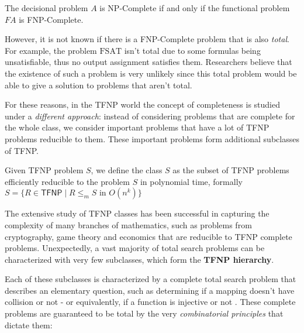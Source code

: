 \begin{proposition}
 The decisional problem $A$ is \textsf{NP}-Complete if and only if the functional problem $FA$ is \textsf{FNP}-Complete.
\end{proposition}
    
However, it is not known if there is a \textsf{FNP}-Complete problem that is also \textit{total}. For example, the problem $\mathrm{FSAT}$ isn't total due to some formulas being unsatisfiable, thus no output assignment satisfies them. Researchers believe that the existence of such a problem is very unlikely since this total problem would be able to give a solution to problems that aren't total. 

For these reasons, in the \textsf{TFNP} world the concept of completeness is studied under a \textit{different approach}: instead of considering problems that are complete for the whole class, we consider important problems that have a lot of \textsf{TFNP} problems reducible to them. These important problems form additional subclasses of \textsf{TFNP}.  

\begin{definition}
 Given \textsf{TFNP} problem $S$, we define the class $S$ as the subset of \textsf{TFNP} problems efficiently reducible to the problem $S$ in polynomial time, formally $S = \{R \in \mathsf{TFNP} \mid R \leq_m S \text{ in } O(n^k)\}$
\end{definition}

The extensive study of \textsf{TFNP} classes has been successful in capturing the complexity of many branches of mathematics, such as problems from cryptography, game theory and economics that are reducible to TFNP complete problems. Unexpectedly, a vast majority of total search problems can be characterized with very few subclasses, which form the \textbf{\textsf{TFNP} hierarchy}. 

\newpage

Each of these subclasses is characterized by a complete total search problem that describes an elementary question, such as determining if a mapping doesn't have collision or not - or equivalently, if a function is injective or not \cite{proofs_circuits_communication,tfnp_characterization}. These complete problems are guaranteed to be total by the very \textit{combinatorial principles} that dictate them:

